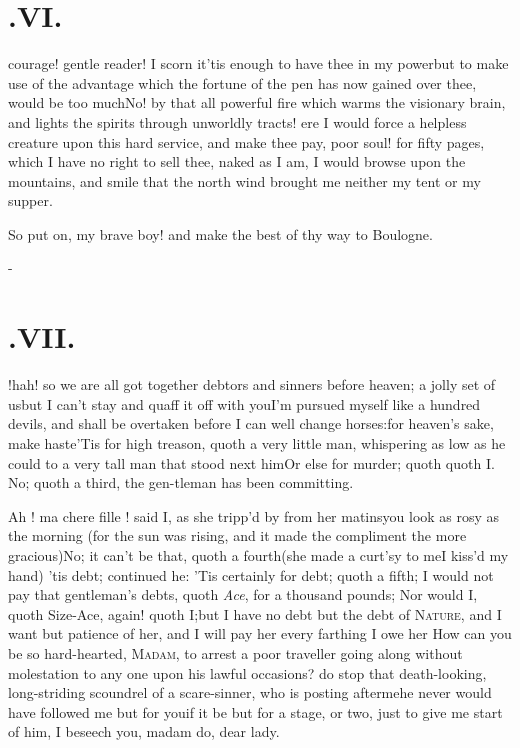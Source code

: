 \documentclass{article}
\begin{document}
\section{.\enspace VI.}

 courage! gentle reader!\break
\tsh I scorn it\tsh ’tis enough\break
to have thee in my power\tsh but to make use of the advantage which the fortune of
the pen has now gained over thee, would be too much\tsh No\tsh !\break
by that all powerful fire which warms the visionary brain, and lights the spirits through
unworldly tracts! ere I would force a helpless creature upon this hard service, and
make thee pay, poor soul! for fifty pages, which I have no right to sell thee,\tsk
naked as I am, I would browse upon the mountains, and smile that the north wind
brought me neither my tent or my supper.

\tsh So put on, my brave boy! and make the best of thy way to
Boulogne.

\vfill{}\eject
\null\kern-\baselineskip
\section{.\enspace VII.}

!\tsh hah!\break
\tsk so we are all got together\break
\tsh debtors and sinners before heaven;\break
a jolly
set of us\tsk but I can’t stay and quaff it off with
you\tsk I’m pursued myself like a hundred devils, and shall be
overtaken before I can well change horses:\tsh for heaven’s
sake, make haste\tsh ’Tis for high treason, quoth a very little
man, whispering as low as he could to a very tall man that stood next
him\tsh Or else for murder; quoth\break
{}
quoth I. No; quoth a third, the gen-\break tleman has been
committing\tsh\tsh.

Ah ! ma chere fille ! said I, as she\break
tripp’d by from her matins\tsk you look 
as rosy as the morning (for the sun was
rising, and it made the compliment the 
more gracious)\tsh No; it can’t be that,\break
quoth a fourth\tsh (she made a curt’sy\break
to me\tsk I kiss’d my hand) ’tis debt;
continued he: ’Tis certainly for debt; 
quoth a fifth; I would not pay that 
gentleman’s debts, quoth \textit{Ace}, for a 
thousand pounds; Nor would I, quoth 
Size-Ace, again! quoth I;\tsk but I have\break
no debt but the debt of \textsc{Nature}, and I
want but patience of her, and I will
pay her every farthing I owe her\tsh\break 
How can you be so hard-hearted, \textsc{Ma\-dam}, 
to arrest a poor traveller going 
along without molestation to any one 
upon his lawful occasions? do stop that
death-looking, long-striding scoundrel of a scare-sinner, who is
posting after\break me\tsh he never would have followed me but
for you\tsh if it be but for a stage, or two, just to give
me start of him, I beseech you, madam\tsh\tsh\break
do, dear lady\tsh.
\end{document}
